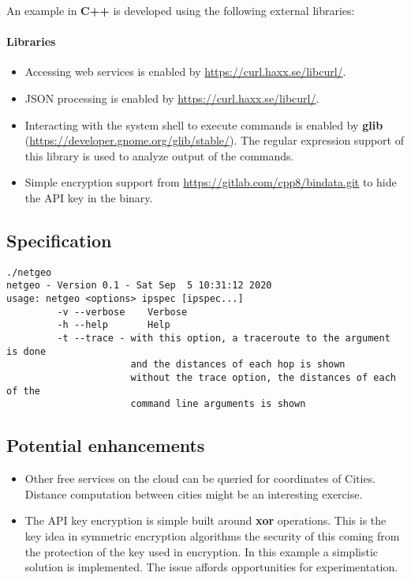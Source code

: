 \documentclass[12pt, a4paper]{article} %
\begin{document}
An example in \textbf{C++} is developed using the following external libraries:
\paragraph{Libraries}
\begin{itemize}
    \item Accessing web services is enabled by \url{https://curl.haxx.se/libcurl/}.
    \item JSON processing is enabled by \url{https://curl.haxx.se/libcurl/}.
    \item Interacting with the system shell to execute commands is enabled by \textbf{glib} (\url{https://developer.gnome.org/glib/stable/}). The regular expression support of this library is used to analyze output of the commands.
    \item Simple encryption support from \url{https://gitlab.com/cpp8/bindata.git} to hide the API key in the binary.
\end{itemize}

\subsection{Specification}
\begin{lstlisting}
./netgeo
netgeo - Version 0.1 - Sat Sep  5 10:31:12 2020
usage: netgeo <options> ipspec [ipspec...]
         -v --verbose    Verbose
         -h --help       Help
         -t --trace - with this option, a traceroute to the argument is done
                      and the distances of each hop is shown
                      without the trace option, the distances of each of the 
                      command line arguments is shown
\end{lstlisting}

\subsection{Potential enhancements}
\begin{itemize}
    \item Other free services on the cloud can be queried for coordinates of Cities. Distance computation between cities might be an interesting exercise.
    \item The API key encryption is simple built around \textbf{xor} operations. This is the key idea in symmetric encryption algorithms the security of this coming from the protection of the key used in encryption. In this example a simplistic solution is implemented. The issue affords opportunities for experimentation.
\end{itemize}
\end{document}
